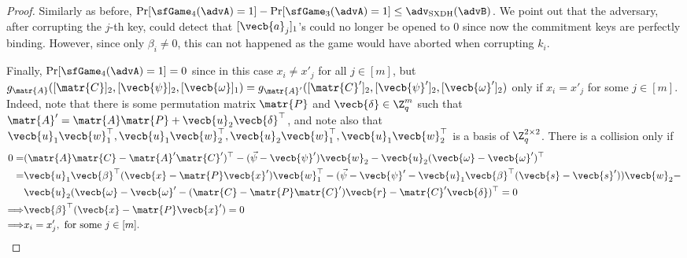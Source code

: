 \begin{proof}
Similarly as before, $\Pr[\sfGame_4(\advA)=1]-\Pr[\sfGame_3(\advA)=1]\leq\adv_\mathrm{SXDH}(\advB)$. We point out that the adversary, after corrupting the $j$-th key, could detect that $[\vecb{a}_j]_1$'s  could no longer be opened to 0 since now the commitment keys are perfectly binding. However, since only $\beta_i\neq 0$, this can not happened as the game would have aborted when corrupting $k_i$.

Finally, $\Pr[\sfGame_4(\advA)=1]=0$ since in this case $x_i \neq x'_j$ for all $j\in[m]$, but $g_\matr{A}([\matr{C}]_2,[\vecb{\psi}]_2,\allowbreak[\vecb{\omega}]_1)=g_{\matr{A}'}([\matr{C}']_2,[\vecb{\psi}']_2,[\vecb{\omega}']_2)$  only if $x_i = x'_j$ for some $j\in[m]$. Indeed, note that there is some permutation matrix $\matr{P}$ and $\vecb{\delta}\in\Z_q^m$ such that $\matr{A}'  = \matr{A}\matr{P}+\vecb{u}_2\vecb{\delta}^\top$, and note also that $\vecb{u}_1\vecb{w}_1^\top,\vecb{u}_1\vecb{w}_2^\top,\vecb{u}_2\vecb{w}_1^\top,\vecb{u}_1\vecb{w}_2^\top$ is a basis of $\Z_q^{2\times 2}$. There is a collision only if
\begin{align*}
0=&(\matr{A}\matr{C}-\matr{A}'\matr{C}')^\top - (\vec{\psi}-\vecb{\psi}')\vecb{w}_2 - \vecb{u}_2(\vecb{\omega}-\vecb{\omega}')^\top\\
=&\vecb{u}_1\vecb{\beta}^\top(\vecb{x}-\matr{P}\vecb{x}')\vecb{w}_1^\top - (\vec{\psi}-\vecb{\psi}'-\vecb{u}_1\vecb{\beta}^\top(\vecb{s}-\vecb{s}'))\vecb{w}_2 - \\
&\vecb{u}_2(\vecb{\omega}-\vecb{\omega}'-(\matr{C}-\matr{P}\matr{C}')\vecb{r}-\matr{C}'\vecb{\delta})^\top = 0\\
\Longrightarrow  &\vecb{\beta}^\top(\vecb{x}-\matr{P}\vecb{x}')=0\\
\Longrightarrow  &x_i  = x'_j,\text{ for some }j\in[m].\\
\end{align*}
\end{proof}